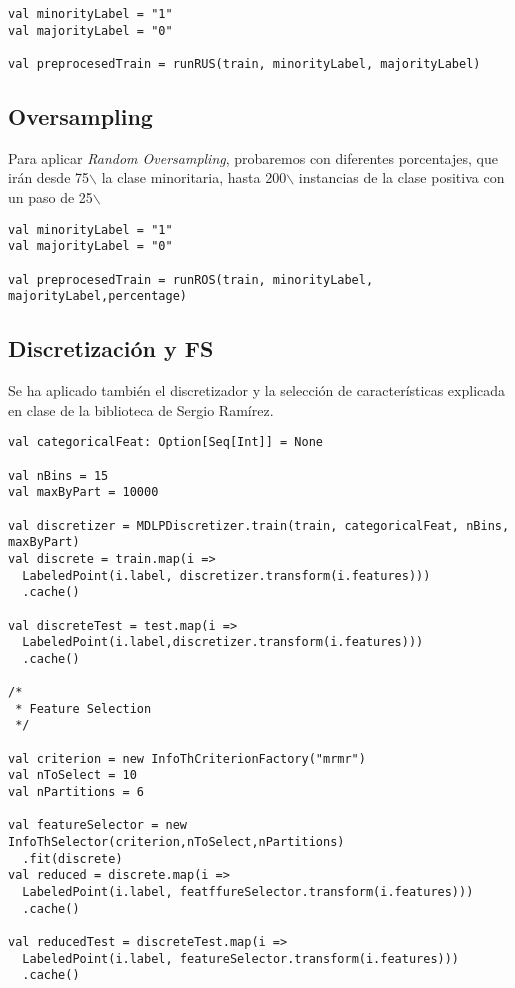 \documentclass[11pt]{article}
\begin{document}
\begin{verbatim}
val minorityLabel = "1"
val majorityLabel = "0"

val preprocesedTrain = runRUS(train, minorityLabel, majorityLabel)  
\end{verbatim}


\subsection{Oversampling}
\label{sec:orgb66e170}

Para aplicar \emph{Random Oversampling}, probaremos con diferentes
porcentajes, que irán desde 75$\backslash$%
la clase minoritaria, hasta 200$\backslash$%
instancias de la clase positiva con un paso de 25$\backslash$%


\begin{verbatim}
val minorityLabel = "1"
val majorityLabel = "0"

val preprocesedTrain = runROS(train, minorityLabel, majorityLabel,percentage)  
\end{verbatim}


\subsection{Discretización y FS}
\label{sec:orgcb1bab8}

Se ha aplicado también el discretizador y la selección de
características explicada en clase de la biblioteca de Sergio Ramírez.

\begin{verbatim}
val categoricalFeat: Option[Seq[Int]] = None

val nBins = 15
val maxByPart = 10000

val discretizer = MDLPDiscretizer.train(train, categoricalFeat, nBins, maxByPart)
val discrete = train.map(i =>
  LabeledPoint(i.label, discretizer.transform(i.features)))
  .cache()

val discreteTest = test.map(i =>
  LabeledPoint(i.label,discretizer.transform(i.features)))
  .cache()

/*
 * Feature Selection
 */

val criterion = new InfoThCriterionFactory("mrmr")
val nToSelect = 10
val nPartitions = 6

val featureSelector = new InfoThSelector(criterion,nToSelect,nPartitions)
  .fit(discrete)
val reduced = discrete.map(i =>
  LabeledPoint(i.label, featffureSelector.transform(i.features)))
  .cache()

val reducedTest = discreteTest.map(i =>
  LabeledPoint(i.label, featureSelector.transform(i.features)))
  .cache()
\end{verbatim}
\end{document}
